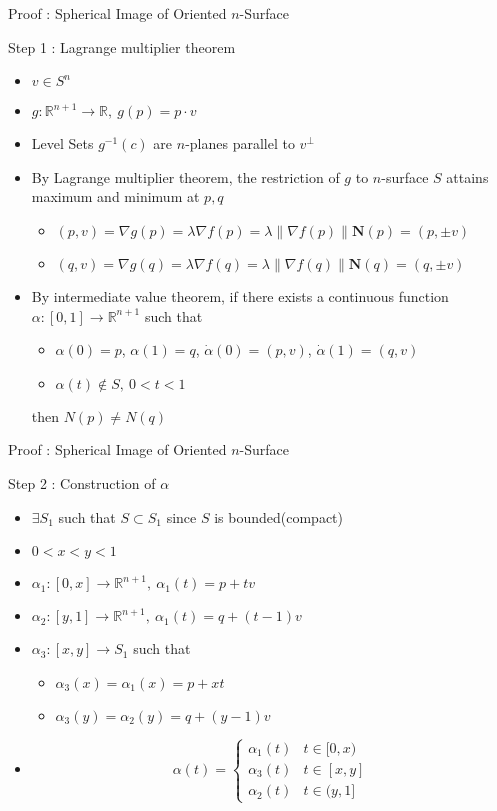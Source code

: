 \documentclass{beamer}
\begin{document}
\begin{frame}{Proof : Spherical Image of Oriented $n$-Surface}
\begin{block}{Step 1 : Lagrange multiplier theorem}
\begin{itemize}
	\item $v \in S^n$
	\item $g : \mathbb{R}^{n+1} \to \mathbb{R},\ g(p) = p \cdot v$
	\item Level Sets $g^{-1}(c)$ are $n$-planes parallel to $v^\perp$
	\item By Lagrange multiplier theorem, the restriction of $g$ to $n$-surface $S$ attains maximum and minimum at $p,q$
	\begin{itemize}
		\item $(p,v) = \nabla g(p) = \lambda \nabla f(p) = \lambda \|\nabla f(p) \|\mathbf{N}(p) = (p,\pm v)$
		\item $(q,v) = \nabla g(q) = \lambda \nabla f(q) = \lambda \|\nabla f(q) \|\mathbf{N}(q) = (q,\pm v)$
	\end{itemize}
	\item By intermediate value theorem, if there exists a continuous function $\alpha : [0,1] \to \mathbb{R}^{n+1}$ such that
	\begin{itemize}
		\item $\alpha(0) = p$, $\alpha(1) = q$, $\dot{\alpha}(0) = (p,v)$, $\dot{\alpha}(1) = (q,v)$ 
		\item $\alpha(t) \notin S,\ 0 < t < 1$
	\end{itemize}
	then $N(p) \ne N(q)$
\end{itemize}
\end{block}
\end{frame}

\begin{frame}{Proof : Spherical Image of Oriented $n$-Surface}
\begin{block}{Step 2 : Construction of $\alpha$}
\begin{itemize}
	\item $\exists S_1$ such that $S \subset S_1$ since $S$ is bounded(compact)
	\item $0 < x < y < 1$
	\item $\alpha_1 : [0,x] \to \mathbb{R}^{n+1},\ \alpha_1(t) = p+tv$
	\item $\alpha_2 : [y,1] \to \mathbb{R}^{n+1},\ \alpha_1(t) = q+(t-1)v$
	\item $\alpha_3 : [x,y] \to S_1$ such that
	\begin{itemize}
		\item $\alpha_3(x) = \alpha_1(x) = p+xt$
		\item $\alpha_3(y) = \alpha_2(y) = q+(y-1)v$
	\end{itemize}
\item $$\alpha(t) = \begin{cases} \alpha_1(t) & t \in [0,x)\\ \alpha_3(t) & t \in [x,y] \\ \alpha_2(t) & t \in (y,1] \end{cases}$$
\end{itemize}
\end{block}
\end{frame}
\end{document}
